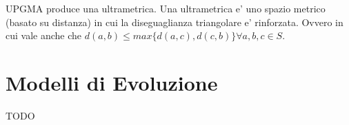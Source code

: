 UPGMA produce una ultrametrica. Una ultrametrica e' uno spazio metrico (basato su distanza) in cui la diseguaglianza triangolare e' rinforzata. Ovvero in cui vale anche che $d(a,b) \leq max \{ d(a,c), d(c,b) \} \forall a,b,c \in S$.

\section{Modelli di Evoluzione}

TODO
